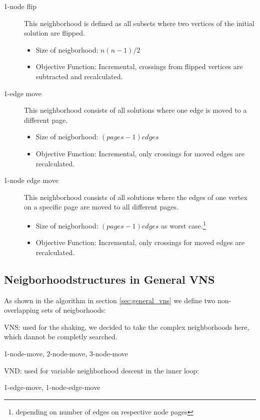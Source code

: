\documentclass{scrartcl}
\begin{document}
\begin{description}
\item[1-node flip] 
    
    This neighborhood is defined as all subsets where two vertices of the initial solution are flipped.
    \begin{itemize}
        \item Size of neigborhood: $n(n-1)/2$
        \item Objective Function: Incremental, crossings from flipped vertices are subtracted and recalculated.

    \end{itemize}

	
\item[1-edge move] This neighborhood consists of all solutions where one edge is moved to a different page. 
     \begin{itemize}
        \item Size of neigborhood: $(pages-1) edges$ 
        \item Objective Function: Incremental, only crossings for moved edges are recalculated.
    \end{itemize}
   
	
\item[1-node edge move] This neighborhood consists of all solutions where the edges of
	one vertex on a specific page are moved to all different pages. 

    \begin{itemize}
        \item Size of neigborhood: $(pages-1) edges$ as worst case.\footnote{depending on number of edges on respective node pages}
        \item Objective Function: Incremental, only crossings for moved edges are recalculated.
    \end{itemize}
    

\end{description}



\subsection{Neigborhoodstructures in General VNS}

As shown in the algorithm in section \ref{sec:general_vns} we define two non-overlapping sets of neigborhoods:

\begin{description}

    \item{VNS}: used for the shaking, we decided to take the complex neighborhoods here, which dannot be completly searched.
                
                1-node-move, 2-node-move, 3-node-move
                
    \item{VND}: used for variable neighborhood descent in the inner loop:
         
                1-edge-move, 1-node-edge-move

\end{description}
\end{document}
